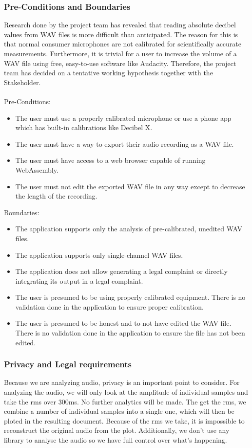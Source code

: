 \subsubsection{Pre-Conditions and Boundaries}\label{subsubsec:pre_conditions_and_boundaries}
Research done by the project team has revealed that reading absolute decibel values from WAV files is more difficult than anticipated.
The reason for this is that normal consumer microphones are not calibrated for scientifically accurate measurements\cite{stackoverflow_spl}. Furthermore, it is trivial for a user
to increase the volume of a WAV file using free, easy-to-use software like Audacity\cite{audacity,audacity_amplify}.
Therefore, the project team has decided on a tentative working hypothesis together with the Stakeholder. \\~\\
Pre-Conditions:
\begin{itemize}
    \item The user must use a properly calibrated microphone or use a phone app which has built-in calibrations like Decibel X\cite{decibelx_ios}\cite{decibelx_android}.
    \item The user must have a way to export their audio recording as a WAV file.
    \item The user must have access to a web browser capable of running WebAssembly.
    \item The user must not edit the exported WAV file in any way except to decrease the length of the recording.
\end{itemize}
Boundaries:
\begin{itemize}
    \item The application supports only the analysis of pre-calibrated, unedited WAV files.
    \item The application supports only single-channel WAV files.
    \item The application does not allow generating a legal complaint or directly integrating its output in a legal complaint.
    \item The user is presumed to be using properly calibrated equipment.
          There is no validation done in the application to ensure proper calibration.
    \item The user is presumed to be honest and to not have edited the WAV file.
          There is no validation done in the application to ensure the file has not been edited.
\end{itemize}

\subsubsection{Privacy and Legal requirements}
Because we are analyzing audio, privacy is an important point to consider.
For analyzing the audio, we will only look at the amplitude of individual samples and take the rms over 300ms.
No further analytics will be made.
The get the rms, we combine a number of individual samples into a single one, which will then be ploted in the resulting document.
Because of the rms we take, it is impossible to reconstruct the original audio from the plot.
Additionally, we don't use any library to analyse the audio so we have full control over what's happening.

